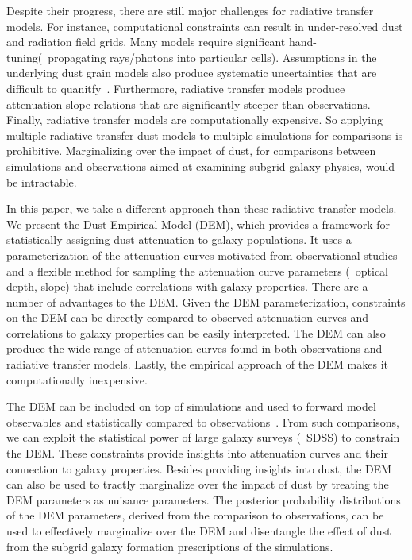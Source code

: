 Despite their progress, there are still major challenges for radiative transfer
models. For instance, computational constraints can result in under-resolved
dust and radiation field grids. Many models require significant
hand-tuning(\eg~propagating rays/photons into particular cells). Assumptions in
the underlying dust grain models also produce systematic uncertainties that are
difficult to quanitfy~\citep[see][for a review]{steinacker2013}. Furthermore,
radiative transfer models produce attenuation-slope relations that are
significantly steeper than observations. Finally, radiative transfer models 
are computationally expensive. So applying multiple radiative transfer dust
models to multiple simulations for comparisons is prohibitive. Marginalizing over
the impact of dust, for comparisons between simulations and observations aimed 
at examining subgrid galaxy physics, would be intractable. 

In this paper, we take a different approach than these radiative transfer
models. We present the Dust Empirical Model (DEM), which provides a framework
for statistically assigning dust attenuation to galaxy populations. It uses a
parameterization of the attenuation curves motivated from observational
studies~\citep[\eg][]{noll2009} and a flexible method for sampling the
attenuation curve parameters (\eg~optical depth, slope) that include 
correlations with galaxy properties. There are a number of advantages to the
DEM. Given the DEM parameterization, constraints on the DEM can be directly 
compared to observed attenuation curves and correlations to galaxy properties
can be easily interpreted. The DEM can also produce the wide range of 
attenuation curves found in both observations and radiative transfer models. 
Lastly, the empirical approach of the DEM makes it computationally inexpensive. 

The DEM can be included on top of simulations and used to forward model
observables and statistically compared to
observations~\citep[\eg][]{nelson2018, baes2019, trcka2020, dickey2020}. From
such comparisons, we can exploit the statistical power of large galaxy surveys 
(\eg~SDSS) to constrain the DEM. These constraints provide insights into
attenuation curves and their connection to galaxy properties. Besides 
providing insights into dust, the DEM can also be used to tractly marginalize
over the impact of dust by treating the DEM parameters as nuisance parameters. 
The posterior probability distributions of the DEM parameters, derived from 
the comparison to observations, can be used to effectively marginalize over 
the DEM and disentangle the effect of dust from the subgrid galaxy formation 
prescriptions of the simulations. 

